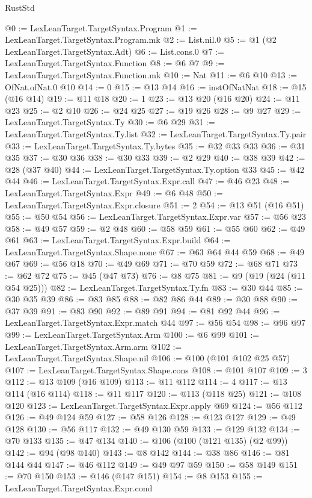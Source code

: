 \begin{lexlean}{RustStd}
\begin{coremodule}
@0 := LexLeanTarget.TargetSyntax.Program
@1 := LexLeanTarget.TargetSyntax.Program.mk
@2 := List.nil.{0}
@5 := @1 (@2 LexLeanTarget.TargetSyntax.Adt)
@6 := List.cons.{0}
@7 := LexLeanTarget.TargetSyntax.Function
@8 := @6 @7
@9 := LexLeanTarget.TargetSyntax.Function.mk
@10 := Nat
@11 := @6 @10
@13 := OfNat.ofNat.{0} @10
@14 := 0
@15 := @13 @14
@16 := instOfNatNat
@18 := @15 (@16 @14)
@19 := @11 @18
@20 := 1
@23 := @13 @20 (@16 @20)
@24 := @11 @23
@25 := @2 @10
@26 := @24 @25
@27 := @19 @26
@28 := @9 @27
@29 := LexLeanTarget.TargetSyntax.Ty
@30 := @6 @29
@31 := LexLeanTarget.TargetSyntax.Ty.list
@32 := LexLeanTarget.TargetSyntax.Ty.pair
@33 := LexLeanTarget.TargetSyntax.Ty.bytes
@35 := @32 @33 @33
@36 := @31 @35
@37 := @30 @36
@38 := @30 @33
@39 := @2 @29
@40 := @38 @39
@42 := @28 (@37 @40)
@44 := LexLeanTarget.TargetSyntax.Ty.option @33
@45 := @42 @44
@46 := LexLeanTarget.TargetSyntax.Expr.call
@47 := @46 @23
@48 := LexLeanTarget.TargetSyntax.Expr
@49 := @6 @48
@50 := LexLeanTarget.TargetSyntax.Expr.closure
@51 := 2
@54 := @13 @51 (@16 @51)
@55 := @50 @54
@56 := LexLeanTarget.TargetSyntax.Expr.var
@57 := @56 @23
@58 := @49 @57
@59 := @2 @48
@60 := @58 @59
@61 := @55 @60
@62 := @49 @61
@63 := LexLeanTarget.TargetSyntax.Expr.build
@64 := LexLeanTarget.TargetSyntax.Shape.none
@67 := @63 @64 @44 @59
@68 := @49 @67
@69 := @56 @18
@70 := @49 @69
@71 := @70 @59
@72 := @68 @71
@73 := @62 @72
@75 := @45 (@47 @73)
@76 := @8 @75
@81 := @9 (@19 (@24 (@11 @54 @25)))
@82 := LexLeanTarget.TargetSyntax.Ty.fn
@83 := @30 @44
@85 := @30 @35 @39
@86 := @83 @85
@88 := @82 @86 @44
@89 := @30 @88
@90 := @37 @39
@91 := @83 @90
@92 := @89 @91
@94 := @81 @92 @44
@96 := LexLeanTarget.TargetSyntax.Expr.match @44
@97 := @56 @54
@98 := @96 @97
@99 := LexLeanTarget.TargetSyntax.Arm
@100 := @6 @99
@101 := LexLeanTarget.TargetSyntax.Arm.arm
@102 := LexLeanTarget.TargetSyntax.Shape.nil
@106 := @100 (@101 @102 @25 @57)
@107 := LexLeanTarget.TargetSyntax.Shape.cons
@108 := @101 @107
@109 := 3
@112 := @13 @109 (@16 @109)
@113 := @11 @112
@114 := 4
@117 := @13 @114 (@16 @114)
@118 := @11 @117
@120 := @113 (@118 @25)
@121 := @108 @120
@123 := LexLeanTarget.TargetSyntax.Expr.apply @69
@124 := @56 @112
@126 := @49 @124 @59
@127 := @58 @126
@128 := @123 @127
@129 := @49 @128
@130 := @56 @117
@132 := @49 @130 @59
@133 := @129 @132
@134 := @70 @133
@135 := @47 @134
@140 := @106 (@100 (@121 @135) (@2 @99))
@142 := @94 (@98 @140)
@143 := @8 @142
@144 := @38 @86
@146 := @81 @144 @44
@147 := @46 @112
@149 := @49 @97 @59
@150 := @58 @149
@151 := @70 @150
@153 := @146 (@147 @151)
@154 := @8 @153
@155 := LexLeanTarget.TargetSyntax.Expr.cond

\end{coremodule}
\end{lexlean}
